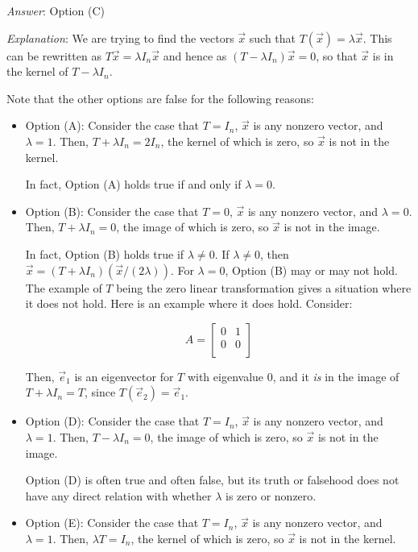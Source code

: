 \documentclass[10pt]{amsart}
\begin{document}
\begin{enumerate}
  {\em Answer}: Option (C)

  {\em Explanation}: We are trying to find the vectors $\vec{x}$ such
  that $T(\vec{x}) = \lambda \vec{x}$. This can be rewritten as
  $T\vec{x} = \lambda I_n \vec{x}$ and hence as $(T - \lambda
  I_n)\vec{x} = 0$, so that $\vec{x}$ is in the kernel of $T - \lambda
  I_n$.

  Note that the other options are false for the following reasons:

  \begin{itemize}
  \item Option (A): Consider the case that $T = I_n$, $\vec{x}$ is any
    nonzero vector, and $\lambda = 1$. Then, $T + \lambda I_n = 2I_n$,
    the kernel of which is zero, so $\vec{x}$ is not in the kernel.

    In fact, Option (A) holds true if and only if $\lambda = 0$.
  \item Option (B): Consider the case that $T = 0$, $\vec{x}$ is any
    nonzero vector, and $\lambda = 0$. Then, $T + \lambda I_n = 0$,
    the image of which is zero, so $\vec{x}$ is not in the image.

    In fact, Option (B) holds true if $\lambda \ne 0$. If $\lambda \ne
    0$, then $\vec{x} = (T + \lambda I_n)(\vec{x}/(2\lambda))$. For
    $\lambda = 0$, Option (B) may or may not hold. The example of $T$
    being the zero linear transformation gives a situation where it
    does not hold. Here is an example where it does hold. Consider:

    $$A = \left[\begin{matrix} 0 & 1 \\ 0 & 0 \\\end{matrix}\right]$$

    Then, $\vec{e}_1$ is an eigenvector for $T$ with eigenvalue $0$,
    and it {\em is} in the image of $T + \lambda I_n = T$, since
    $T(\vec{e}_2) = \vec{e}_1$.
  \item Option (D): Consider the case that $T = I_n$, $\vec{x}$ is any
    nonzero vector, and $\lambda = 1$. Then, $T - \lambda I_n = 0$,
    the image of which is zero, so $\vec{x}$ is not in the image.

    Option (D) is often true and often false, but its truth or
    falsehood does not have any direct relation with whether $\lambda$
    is zero or nonzero.
  \item Option (E): Consider the case that $T = I_n$, $\vec{x}$ is any
    nonzero vector, and $\lambda = 1$. Then, $\lambda T = I_n$,
    the kernel of which is zero, so $\vec{x}$ is not in the kernel.


\end{itemize}
\end{enumerate}
\end{document}
